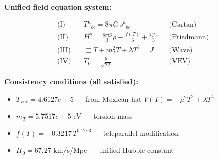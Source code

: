 
\textbf{Unified field equation system:}

\begin{align}
  \text{(I)} \quad & T^a{}_{bc} = 8\pi G \, s^a{}_{bc} && \text{(Cartan)} \\
  \text{(II)} \quad & H^2 = \frac{8\pi G}{3}\rho - \frac{f(T)}{6} + \frac{Tf_T}{3} && \text{(Friedmann)} \\
  \text{(III)} \quad & \Box T + m_T^2 T + \lambda T^3 = J && \text{(Wave)} \\
  \text{(IV)} \quad & T_0 = \frac{\mu}{\sqrt{2\lambda}} && \text{(VEV)}
\end{align}

\textbf{Consistency conditions (all satisfied):}
\begin{itemize}
  \item $T_{\text{vev}} = 4.6127e+5$ — from Mexican hat $V(T) = -\mu^2 T^2 + \lambda T^4$
  \item $m_T = 5.7517e+5$ eV — torsion mass
  \item $f(T) = -0.3217 \, T^{0.1293}$ — teleparallel modification
  \item $H_0 = 67.27$ km/s/Mpc — unified Hubble constant
\end{itemize}
